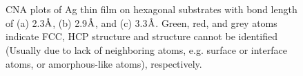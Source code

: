 \begingroup
\begin{figure}[!ht]
  \centering
  \label{Chap:Ag/ZnO:fig:7a}
  \\
  \label{Chap:Ag/ZnO:fig:7b}
  \\
  \label{Chap:Ag/ZnO:fig:7c}
\caption[Common neighbor analysis plots of Ag thin film on hexagonal substrates.]{\ac{CNA} plots of Ag thin film on hexagonal substrates with bond length of (a) 2.3$\mbox{\normalfont\AA}$, (b) 2.9$\mbox{\normalfont\AA}$, and (c) 3.3$\mbox{\normalfont\AA}$. Green, red, and grey atoms indicate \ac{FCC}, \ac{HCP} structure and structure cannot be identified (Usually due to lack of neighboring atoms, e.g. surface or interface atoms, or amorphous-like atoms), respectively.}
\label{Chap:Ag/ZnO:fig7}
\end{figure}
\endgroup

